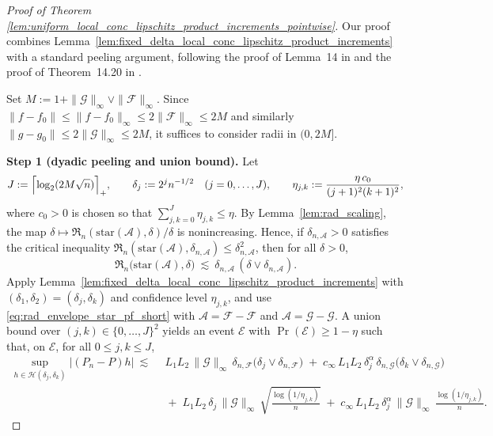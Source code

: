 \documentclass[11pt]{article}
\theoremstyle{plain}
\theoremstyle{definition} %
\begin{document}
\begin{proof}[Proof of Theorem \ref{lem:uniform_local_conc_lipschitz_product_increments_pointwise}]
Our proof combines Lemma~\ref{lem:fixed_delta_local_conc_lipschitz_product_increments} with a standard peeling argument, following the proof of Lemma~14 in \cite{foster2023orthogonal} and the proof of Theorem~14.20 in \cite{wainwright2019high}.

Set $M:=1+\|\mathcal G\|_\infty\vee \|\mathcal F\|_\infty$. Since
$\|f-f_0\|\le \|f-f_0\|_\infty\le 2\|\mathcal F\|_\infty\le 2M$ and similarly
$\|g-g_0\|\le 2\|\mathcal G\|_\infty\le 2M$, it suffices to consider radii in $(0,2M]$.

\medskip
\noindent\textbf{Step 1 (dyadic peeling and union bound).}
Let
\[
J:=\Bigl\lceil \log_2(2M\sqrt n)\Bigr\rceil_+,\qquad
\delta_j:=2^j n^{-1/2}\quad (j=0,\dots,J),
\qquad
\eta_{j,k}:=\frac{\eta\,c_0}{(j+1)^2(k+1)^2},
\]
where $c_0>0$ is chosen so that $\sum_{j,k=0}^J \eta_{j,k}\le \eta$.
By Lemma~\ref{lem:rad_scaling}, the map
$\delta\mapsto \mathfrak R_n(\mathrm{star}(\mathcal A),\delta)/\delta$ is nonincreasing. Hence, if
$\delta_{n,\mathcal A}>0$ satisfies the critical inequality
$\mathfrak R_n(\mathrm{star}(\mathcal A),\delta_{n,\mathcal A})\le \delta_{n,\mathcal A}^2$, then for all $\delta>0$,
\begin{equation}
\label{eq:rad_envelope_star_pf_short}
\mathfrak R_n\bigl(\mathrm{star}(\mathcal A),\delta\bigr)
\ \lesssim\
\delta_{n,\mathcal A}\,(\delta\vee \delta_{n,\mathcal A}).
\end{equation}
Apply Lemma~\ref{lem:fixed_delta_local_conc_lipschitz_product_increments} with
$(\delta_1,\delta_2)=(\delta_j,\delta_k)$ and confidence level $\eta_{j,k}$, and use
\eqref{eq:rad_envelope_star_pf_short} with $\mathcal A=\mathcal F-\mathcal F$ and $\mathcal A=\mathcal G-\mathcal G$.
A union bound over $(j,k)\in\{0,\dots,J\}^2$ yields an event $\mathcal E$ with $\Pr(\mathcal E)\ge 1-\eta$ such that, on $\mathcal E$,
for all $0\le j,k\le J$,
\begin{align}
\label{eq:grid_bound_pointwise_wcrit_pf_short}
\sup_{h\in\mathcal H(\delta_j,\delta_k)} |(P_n-P)h|
\ \lesssim\
&\ L_1L_2\,\|\mathcal G\|_\infty \,
\delta_{n,\mathcal F}\bigl(\delta_j\vee \delta_{n,\mathcal F}\bigr)
\;+\;
c_\infty\,L_1L_2\,\delta_j^{\alpha}\,
\delta_{n,\mathcal G}\bigl(\delta_k\vee \delta_{n,\mathcal G}\bigr)\nonumber\\
&\;+\;
L_1L_2\,\delta_j\,\|\mathcal G\|_\infty\,
\sqrt{\frac{\log(1/\eta_{j,k})}{n}}
\;+\;
c_\infty\,L_1L_2\,\delta_j^{\alpha}\,\|\mathcal G\|_\infty\,
\frac{\log(1/\eta_{j,k})}{n}.
\end{align}


\end{proof}
\end{document}

